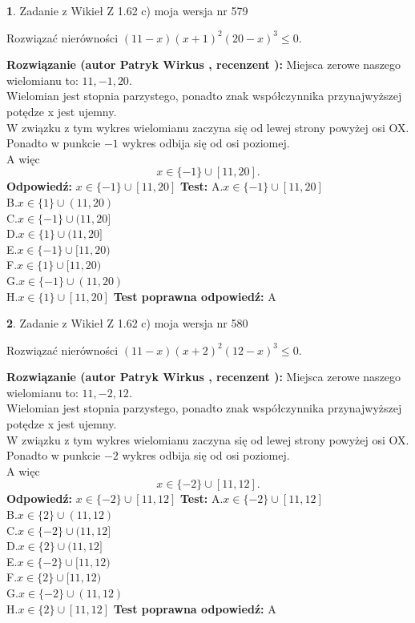 \documentclass[12pt, a4paper]{article}
\theoremstyle{definition} %
\newtheorem{zad}{}
\newcommand{\zadStart}[1]{\begin{zad}#1\newline}
\newcommand{\zadStop}{\end{zad}}
\newcommand{\rozwStart}[2]{\noindent \textbf{Rozwiązanie (autor #1 , recenzent #2): }\newline}
\newcommand{\rozwStop}{\newline}
\newcommand{\odpStart}{\noindent \textbf{Odpowiedź:}\newline}
\newcommand{\odpStop}{\newline}
\newcommand{\testStart}{\noindent \textbf{Test:}\newline}
\newcommand{\testStop}{\newline}
\newcommand{\kluczStart}{\noindent \textbf{Test poprawna odpowiedź:}\newline}
\newcommand{\kluczStop}{\newline}
\begin{document}
\zadStart{Zadanie z Wikieł Z 1.62 c) moja wersja nr 579}

Rozwiązać nierówności $(11-x)(x+1)^{2}(20-x)^{3}\le0$.
\zadStop
\rozwStart{Patryk Wirkus}{}
Miejsca zerowe naszego wielomianu to: $11, -1, 20$.\\
Wielomian jest stopnia parzystego, ponadto znak współczynnika przy\linebreak najwyższej potędze x jest ujemny.\\ W związku z tym wykres wielomianu zaczyna się od lewej strony powyżej osi OX.\\
Ponadto w punkcie $-1$ wykres odbija się od osi poziomej.\\
A więc $$x \in \{-1\} \cup [11,20].$$
\rozwStop
\odpStart
$x \in \{-1\} \cup [11,20]$
\odpStop
\testStart
A.$x \in \{-1\} \cup [11,20]$\\
B.$x \in \{1\} \cup (11,20)$\\
C.$x \in \{-1\} \cup (11,20]$\\
D.$x \in \{1\} \cup (11,20]$\\
E.$x \in \{-1\} \cup [11,20)$\\
F.$x \in \{1\} \cup [11,20)$\\
G.$x \in \{-1\} \cup (11,20)$\\
H.$x \in \{1\} \cup [11,20]$
\testStop
\kluczStart
A
\kluczStop



\zadStart{Zadanie z Wikieł Z 1.62 c) moja wersja nr 580}

Rozwiązać nierówności $(11-x)(x+2)^{2}(12-x)^{3}\le0$.
\zadStop
\rozwStart{Patryk Wirkus}{}
Miejsca zerowe naszego wielomianu to: $11, -2, 12$.\\
Wielomian jest stopnia parzystego, ponadto znak współczynnika przy\linebreak najwyższej potędze x jest ujemny.\\ W związku z tym wykres wielomianu zaczyna się od lewej strony powyżej osi OX.\\
Ponadto w punkcie $-2$ wykres odbija się od osi poziomej.\\
A więc $$x \in \{-2\} \cup [11,12].$$
\rozwStop
\odpStart
$x \in \{-2\} \cup [11,12]$
\odpStop
\testStart
A.$x \in \{-2\} \cup [11,12]$\\
B.$x \in \{2\} \cup (11,12)$\\
C.$x \in \{-2\} \cup (11,12]$\\
D.$x \in \{2\} \cup (11,12]$\\
E.$x \in \{-2\} \cup [11,12)$\\
F.$x \in \{2\} \cup [11,12)$\\
G.$x \in \{-2\} \cup (11,12)$\\
H.$x \in \{2\} \cup [11,12]$
\testStop
\kluczStart
A
\kluczStop
\end{document}
